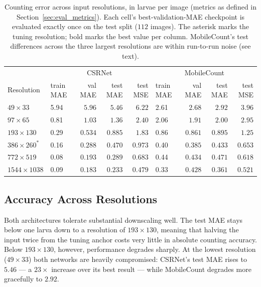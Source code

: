 \documentclass[conference]{IEEEtran}
\begin{document}
\begin{table}[t]
    \centering
    \caption{Counting error across input resolutions, in larvae per
    image (metrics as defined in Section~\ref{sec:eval_metrics}). Each
    cell's best-validation-MAE checkpoint is evaluated exactly once on
    the test split ($112$ images). The asterisk marks the tuning
    resolution; bold marks the best value per column. MobileCount's
    test differences across the three largest resolutions are within
    run-to-run noise (see text).}
    \label{tab:resolution_test}
    \small
    \begin{tabular}{l lrrr lrrr}
        \toprule
        & \multicolumn{4}{c}{CSRNet}& \multicolumn{4}{c}{MobileCount}\\

              Resolution&  train MAE&val MAE & test MAE & test MSE &  train MAE&val MAE & test MAE & test MSE \\
        \midrule
        $49\times33$     &  5.94&$5.96$  & $5.46$  & $6.22$  &  2.61&$2.68$  & $2.92$  & $3.96$ \\
        $97\times65$     &  0.81&$1.03$  & $1.36$  & $2.40$  &  2.06&$1.91$  & $2.00$  & $2.95$ \\
        $193\times130$   &  0.29&$0.534$ & $0.885$ & $1.83$  &  0.86&$0.861$ & $0.895$ & $1.25$ \\
        $386\times260^*$ &  0.16&$0.288$ & $0.470$ & $0.973$ &  0.40&$\mathbf{0.385}$ & $0.433$ & $0.653$ \\
        $772\times519$   &  0.08&$0.193$ & $0.289$ & $0.683$ &  0.44&$0.434$ & $0.471$ & $0.618$ \\
        $1544\times1038$ &  0.09&$\mathbf{0.183}$ & $\mathbf{0.233}$ & $\mathbf{0.479}$ &  0.33&$0.428$ & $\mathbf{0.361}$ & $\mathbf{0.521}$ \\
        \bottomrule
    \end{tabular}
\end{table}

\subsection{Accuracy Across Resolutions}
Both architectures tolerate substantial downscaling well. The test MAE stays
below one larva down to a resolution of $193\times130$, meaning that halving
the input twice from the tuning anchor costs very little in absolute counting
accuracy. Below $193\times130$, however, performance degrades sharply. At the
lowest resolution ($49\times33$) both networks are heavily compromised:
CSRNet's test MAE rises to $5.46$ — a $23\times$ increase over its best result
— while MobileCount degrades more gracefully to $2.92$.
\end{document}

